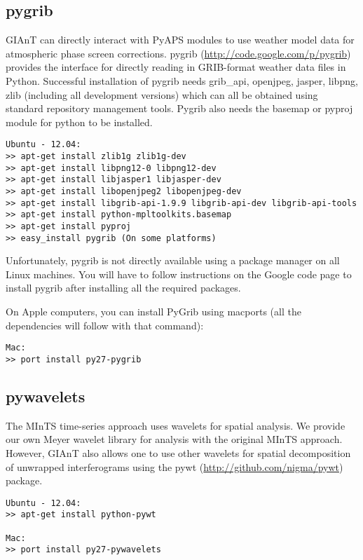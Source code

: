 \subsection{pygrib}
GIAnT can directly interact with PyAPS modules to use weather model data for atmospheric phase screen corrections. pygrib (\url{http://code.google.com/p/pygrib}) provides the interface for directly reading in GRIB-format weather data files in Python. Successful installation of pygrib needs grib\_api, openjpeg, jasper, libpng, zlib (including all development versions) which can all be obtained using standard repository management tools. Pygrib also needs the basemap or pyproj module for python to be installed. 
\begin{verbatim}
Ubuntu - 12.04:
>> apt-get install zlib1g zlib1g-dev
>> apt-get install libpng12-0 libpng12-dev
>> apt-get install libjasper1 libjasper-dev
>> apt-get install libopenjpeg2 libopenjpeg-dev
>> apt-get install libgrib-api-1.9.9 libgrib-api-dev libgrib-api-tools
>> apt-get install python-mpltoolkits.basemap
>> apt-get install pyproj
>> easy_install pygrib (On some platforms)
\end{verbatim}

Unfortunately, pygrib is not directly available using a package manager on all Linux machines. You will have to follow instructions on the Google code page to install pygrib after installing all the required packages. 

On Apple computers, you can install PyGrib using macports (all the dependencies will follow with that command):

\begin{verbatim}
Mac:
>> port install py27-pygrib
\end{verbatim}

\subsection{pywavelets}
The MInTS \cite{hetland:mints} time-series approach uses wavelets for spatial analysis. We provide our own Meyer wavelet library for analysis with the original MInTS approach. However, GIAnT also allows one to use other wavelets for spatial decomposition of unwrapped interferograms using the pywt (\url{http://github.com/nigma/pywt}) package. 

\begin{verbatim}
Ubuntu - 12.04:
>> apt-get install python-pywt

Mac:
>> port install py27-pywavelets
\end{verbatim}

